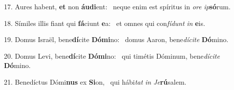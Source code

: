 17. Aures habent, \textbf{et} non \textbf{áu}\textbf{di}ent: \ast\  neque enim est spíritus in \textit{o}\textit{re} \textit{ip}\textbf{só}rum.\

18. Símiles illis fiant qui \textbf{fá}ciunt \textbf{e}a: \ast\  et omnes qui con\textit{fí}\textit{dunt} \textit{in} \textbf{e}is.\

19. Domus Israël, bene\textbf{dí}cite \textbf{Dó}\textbf{mi}no: \ast\  domus Aaron, bene\textit{dí}\textit{ci}\textit{te} \textbf{Dó}mino.\

20. Domus Levi, bene\textbf{dí}cite \textbf{Dó}\textbf{mi}no: \ast\  qui timétis Dóminum, bene\textit{dí}\textit{ci}\textit{te} \textbf{Dó}mino.\

21. Benedíctus Dómi\textbf{nus} ex \textbf{Si}on, \ast\  qui hábi\textit{tat} \textit{in} \textit{Je}\textbf{rú}salem.\

